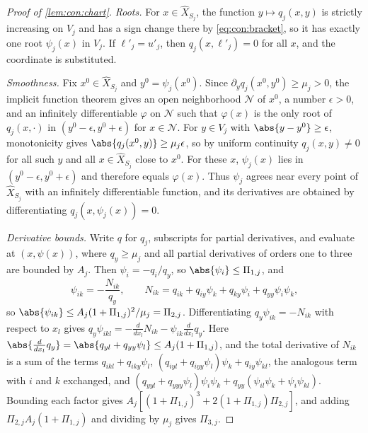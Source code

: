 \begin{proof}[Proof of \cref{lem:con:chart}]
\emph{Roots.} For $x\in\widehat X_{S_j}$, the function $y\mapsto q_j(x,y)$ is
strictly increasing on $V_j$ and has a sign change there by
\eqref{eq:con:bracket}, so it has exactly one root $\psi_j(x)$ in $V_j$. If
$\ell'_j=u'_j$, then $q_j(x,\ell'_j)=0$ for all $x$, and the coordinate is
substituted.

\emph{Smoothness.} Fix $x^0\in\widehat X_{S_j}$ and $y^0=\psi_j(x^0)$. Since
$\partial_yq_j(x^0,y^0)\ge\mu_j>0$, the implicit function theorem gives an
open neighborhood $\mathcal N$ of $x^0$, a number $\epsilon>0$, and an
infinitely differentiable $\varphi$ on $\mathcal N$ such that $\varphi(x)$ is
the only root of $q_j(x,\cdot)$ in $(y^0-\epsilon,y^0+\epsilon)$ for
$x\in\mathcal N$. For $y\in V_j$ with $\abs{y-y^0}\ge\epsilon$, monotonicity
gives $\abs{q_j(x^0,y)}\ge\mu_j\epsilon$, so by uniform continuity
$q_j(x,y)\ne0$ for all such $y$ and all $x\in\widehat X_{S_j}$ close to $x^0$.
For these $x$, $\psi_j(x)$ lies in $(y^0-\epsilon,y^0+\epsilon)$ and therefore
equals $\varphi(x)$. Thus $\psi_j$ agrees near every point of
$\widehat X_{S_j}$ with an infinitely differentiable function, and its
derivatives are obtained by differentiating $q_j(x,\psi_j(x))=0$.

\emph{Derivative bounds.} Write $q$ for $q_j$, subscripts for partial
derivatives, and evaluate at $(x,\psi(x))$, where $q_y\ge\mu_j$ and all
partial derivatives of orders one to three are bounded by $A_j$. Then
$\psi_i=-q_i/q_y$, so $\abs{\psi_i}\le\Pi_{1,j}$, and
\[
 \psi_{ik}=-\frac{N_{ik}}{q_y},\qquad
 N_{ik}=q_{ik}+q_{iy}\psi_k+q_{ky}\psi_i+q_{yy}\psi_i\psi_k ,
\]
so $\abs{\psi_{ik}}\le A_j(1+\Pi_{1,j})^2/\mu_j=\Pi_{2,j}$. Differentiating
$q_y\psi_{ik}=-N_{ik}$ with respect to $x_l$ gives
$q_y\psi_{ikl}=-\frac{d}{dx_l}N_{ik}-\psi_{ik}\frac d{dx_l}q_y$. Here
$\abs{\frac d{dx_l}q_y}=\abs{q_{yl}+q_{yy}\psi_l}\le A_j(1+\Pi_{1,j})$, and the
total derivative of $N_{ik}$ is a sum of the terms $q_{ikl}+q_{iky}\psi_l$,
$(q_{iyl}+q_{iyy}\psi_l)\psi_k+q_{iy}\psi_{kl}$, the analogous term with $i$
and $k$ exchanged, and
$(q_{yyl}+q_{yyy}\psi_l)\psi_i\psi_k+q_{yy}(\psi_{il}\psi_k+\psi_i\psi_{kl})$.
Bounding each factor gives
$A_j[(1+\Pi_{1,j})^3+2(1+\Pi_{1,j})\Pi_{2,j}]$, and adding
$\Pi_{2,j}A_j(1+\Pi_{1,j})$ and dividing by $\mu_j$ gives $\Pi_{3,j}$.


\end{proof}
